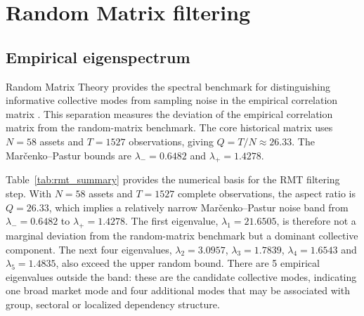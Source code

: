 \section{Random Matrix filtering}
\label{sec:rmt}

\subsection{Empirical eigenspectrum}

Random Matrix Theory provides the spectral benchmark for distinguishing informative collective modes from sampling noise in the empirical correlation matrix \cite{laloux_1999_noise,plerou_2002_random}. This separation measures the deviation of the empirical correlation matrix from the random-matrix benchmark. The core historical matrix uses $N=58$ assets and $T=1527$ observations, giving $Q=T/N\approx26.33$. The Mar\v{c}enko--Pastur bounds are $\lambda_-=0.6482$ and $\lambda_+=1.4278$.

\begin{center}
\label{tab:rmt_summary}
\end{center}

Table~\ref{tab:rmt_summary} provides the numerical basis for the RMT filtering step. With $N=58$ assets and $T=1527$ complete observations, the aspect ratio is $Q=26.33$, which implies a relatively narrow Mar\v{c}enko--Pastur noise band from $\lambda_-=0.6482$ to $\lambda_+=1.4278$. The first eigenvalue, $\lambda_1=21.6505$, is therefore not a marginal deviation from the random-matrix benchmark but a dominant collective component. The next four eigenvalues, $\lambda_2=3.0957$, $\lambda_3=1.7839$, $\lambda_4=1.6543$ and $\lambda_5=1.4835$, also exceed the upper random bound. There are 5 empirical eigenvalues outside the band: these are the candidate collective modes, indicating one broad market mode and four additional modes that may be associated with group, sectoral or localized dependency structure.

